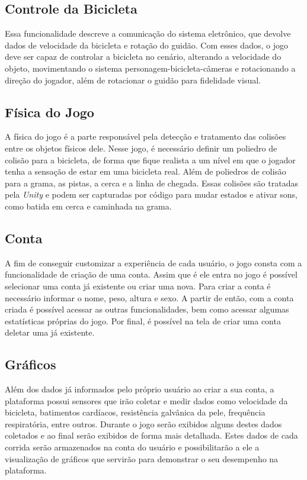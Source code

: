 \subsection{Controle da Bicicleta}
Essa funcionalidade descreve a comunicação do sistema eletrônico, que devolve dados de velocidade da bicicleta e rotação do guidão. Com esses dados, o jogo deve ser capaz de controlar a bicicleta no cenário, alterando a velocidade do objeto, movimentando o sistema personagem-bicicleta-câmeras e rotacionando a direção do jogador, além de rotacionar o guidão para fidelidade visual.

\subsection{Física do Jogo}
A física do jogo é a parte responsável pela detecção e tratamento das colisões entre os objetos físicos dele. Nesse jogo, é necessário definir um poliedro de colisão para a bicicleta, de forma que fique realista a um nível em que o jogador tenha a sensação de estar em uma bicicleta real. Além de poliedros de colisão para a grama, as pistas, a cerca e a linha de chegada. Essas colisões são tratadas pela \textit{Unity} e podem ser capturadas por código para mudar estados e ativar sons, como batida em cerca e caminhada na grama.

\subsection{Conta}
A fim de conseguir customizar a experiência de cada usuário, o jogo consta com a funcionalidade de criação de uma conta. Assim que é ele entra no jogo é possível selecionar uma conta já existente ou criar uma nova. Para criar a conta é necessário informar o nome, peso, altura e sexo. A partir de então, com a conta criada é possível acessar as outras funcionalidades, bem como acessar algumas estatísticas próprias do jogo. Por final, é possível na tela de criar uma conta deletar uma já existente.

\subsection{Gráficos}
Além dos dados já informados pelo próprio usuário ao criar a sua conta, a plataforma possui sensores que irão coletar e medir dados como velocidade da bicicleta, batimentos cardíacos, resistência galvânica da pele, frequência respiratória, entre outros. Durante o jogo serão exibidos alguns destes dados coletados e ao final serão exibidos de forma mais detalhada. Estes dados de cada corrida serão armazenados na conta do usuário e possibilitarão a ele a visualização de gráficos que servirão para demonstrar o seu desempenho na plataforma.

